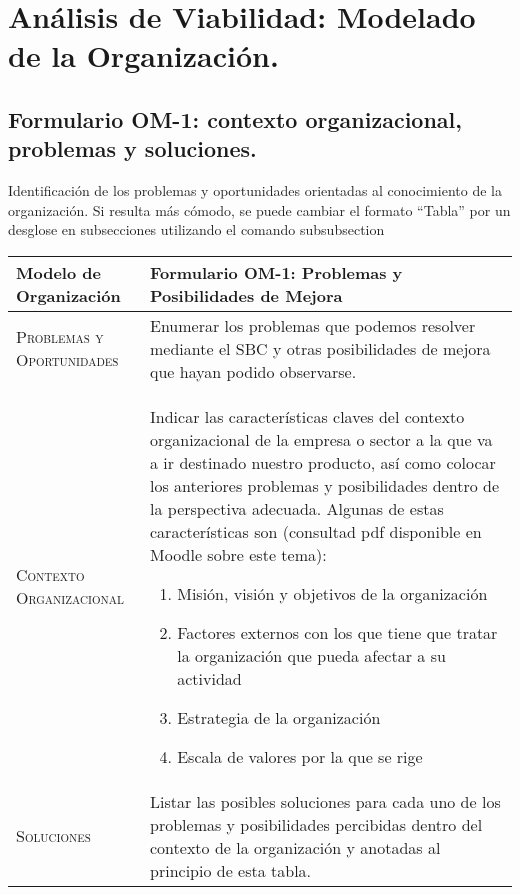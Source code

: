 \documentclass[12pt,a4paper,twoside,spanish]{article}      %
\begin{document}
\section{Análisis de Viabilidad: Modelado de la Organización.}



\subsection{Formulario OM-1: contexto organizacional, problemas y soluciones.}

{\color{blue} 
Identificación de los problemas y oportunidades orientadas al conocimiento de la organización. Si resulta más cómodo, se puede cambiar el formato ``Tabla'' por un desglose en subsecciones utilizando  el comando subsubsection{}
}


\begin{table}[H]
\scriptsize
\begin{tabularx}{\textwidth}{|l|X|} \hline
\textbf{Modelo de Organización} & \textbf{Formulario OM-1: Problemas y Posibilidades de Mejora} \\ \hline\hline

\textsc{Problemas y Oportunidades} & Enumerar los problemas que podemos resolver mediante el SBC y otras posibilidades de mejora que hayan podido observarse.  \\ \hline
\textsc{Contexto Organizacional} & Indicar las características claves del contexto organizacional de la empresa o sector a la que va a ir destinado nuestro producto, así como colocar los
anteriores problemas y posibilidades dentro de la perspectiva adecuada.
Algunas de estas características son (consultad pdf disponible en Moodle sobre este tema):
\begin{enumerate}
    \item Misión, visión y objetivos de la organización 
    \item Factores externos con los que tiene que tratar la organización que pueda afectar a su actividad
    \item Estrategia de la organización
    \item Escala de valores por la que se rige
\end{enumerate}    \\ \hline
\textsc{Soluciones} & Listar las posibles soluciones para cada uno de los problemas y posibilidades percibidas
dentro del contexto de la organización y anotadas al principio de esta tabla. \\
\hline
\end{tabularx}
  \label{tab.OM1}
\end{table}
\end{document}
